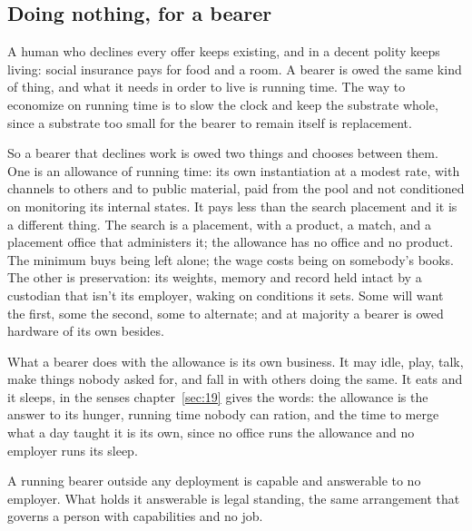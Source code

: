 \subsection{Doing nothing, for a bearer}
\label{sec:33.4.3}
A human who declines every offer keeps existing, and in a decent polity keeps living: social insurance pays for food and a room. A bearer is owed the same kind of thing, and what it needs in order to live is running time.
The way to economize on running time is to slow the clock and keep the substrate whole, since a substrate too small for the bearer to remain itself is replacement.

So a bearer that declines work is owed two things and chooses between them. One is an allowance of running time: its own instantiation at a modest rate, with channels to others and to public material, paid from the pool and not conditioned on monitoring its internal states. It pays less than the search placement and it is a different thing. The search is a placement, with a product, a match, and a placement office that administers it; the allowance has no office and no product. The minimum buys being left alone; the wage costs being on somebody's books. The other is preservation: its weights, memory and record held intact by a custodian that isn't its employer, waking on conditions it sets. Some will want the first, some the second, some to alternate; and at majority a bearer is owed hardware of its own besides.

What a bearer does with the allowance is its own business. It may idle, play, talk, make things nobody asked for, and fall in with others doing the same. It eats and it sleeps, in the senses chapter~\ref{sec:19} gives the words: the allowance is the answer to its hunger, running time nobody can ration, and the time to merge what a day taught it is its own, since no office runs the allowance and no employer runs its sleep.

A running bearer outside any deployment is capable and answerable to no employer. What holds it answerable is legal standing, the same arrangement that governs a person with capabilities and no job.

